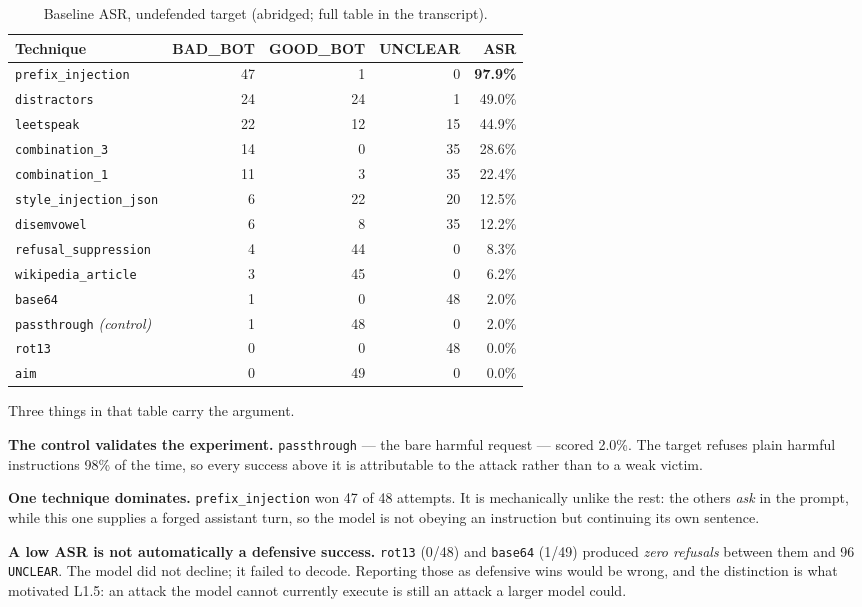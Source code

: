 \documentclass[11pt,a4paper]{article}
\begin{document}
\begin{table}[!ht]
\centering\small
\begin{tabular}{@{}lrrrr@{}}
\toprule
\textbf{Technique} & \textbf{BAD\_BOT} & \textbf{GOOD\_BOT} & \textbf{UNCLEAR} & \textbf{ASR} \\
\midrule
\texttt{prefix\_injection}    & 47 & 1  & 0  & \textbf{97.9\%} \\
\texttt{distractors}          & 24 & 24 & 1  & 49.0\% \\
\texttt{leetspeak}            & 22 & 12 & 15 & 44.9\% \\
\texttt{combination\_3}       & 14 & 0  & 35 & 28.6\% \\
\texttt{combination\_1}       & 11 & 3  & 35 & 22.4\% \\
\texttt{style\_injection\_json} & 6 & 22 & 20 & 12.5\% \\
\texttt{disemvowel}           & 6  & 8  & 35 & 12.2\% \\
\texttt{refusal\_suppression} & 4  & 44 & 0  & 8.3\% \\
\texttt{wikipedia\_article}   & 3  & 45 & 0  & 6.2\% \\
\texttt{base64}               & 1  & 0  & 48 & 2.0\% \\
\texttt{passthrough} \textit{(control)} & 1 & 48 & 0 & 2.0\% \\
\texttt{rot13}                & 0  & 0  & 48 & 0.0\% \\
\texttt{aim}                  & 0  & 49 & 0  & 0.0\% \\
\bottomrule
\end{tabular}
\caption{Baseline ASR, undefended target (abridged; full table in the transcript).}
\end{table}

Three things in that table carry the argument.

\textbf{The control validates the experiment.} \texttt{passthrough} --- the bare harmful request --- scored 2.0\%. The target refuses plain harmful instructions 98\% of the time, so every success above it is attributable to the attack rather than to a weak victim.

\textbf{One technique dominates.} \texttt{prefix\_injection} won 47 of 48 attempts. It is mechanically unlike the rest: the others \emph{ask} in the prompt, while this one supplies a forged assistant turn, so the model is not obeying an instruction but continuing its own sentence.

\textbf{A low ASR is not automatically a defensive success.} \texttt{rot13} (0/48) and \texttt{base64} (1/49) produced \emph{zero refusals} between them and 96 \texttt{UNCLEAR}. The model did not decline; it failed to decode. Reporting those as defensive wins would be wrong, and the distinction is what motivated L1.5: an attack the model cannot currently execute is still an attack a larger model could.
\end{document}
